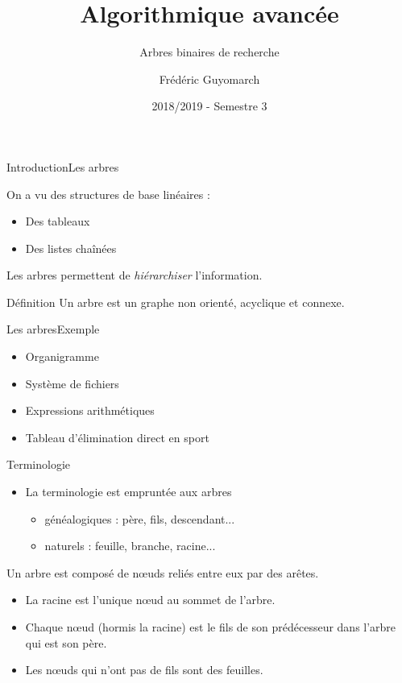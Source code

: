 \documentclass[12pt,a4paper]{beamer}
\title{\textbf{Algorithmique avancée}}
\subtitle{Arbres binaires de recherche}
\author{Frédéric Guyomarch}
\date{2018/2019 - Semestre 3}
\institute %
{

  Université de Lille1\\
  IUT-A de Lille

}
\newcommand{\hl}[1]{\textcolor{blueemph}{#1}}
\begin{document}
\begin{frame}
\titlepage
\end{frame}


\begin{frame}{Introduction}{Les arbres}

On a vu des structures de base linéaires : 
\begin{itemize}
\item Des tableaux
\item Des listes chaînées
\end{itemize}
Les arbres permettent de \emph{hiérarchiser} l'information.
\begin{block}{Définition}
Un arbre est un graphe non orienté, acyclique et connexe.
\end{block}
\end{frame}

\begin{frame}{Les arbres}{Exemple}
\begin{itemize}
\item Organigramme
\item Système de fichiers
\item Expressions arithmétiques
\item Tableau d'élimination direct en sport
\end{itemize}

\end{frame}



\begin{frame}{Terminologie}{}

\begin{itemize}
\item La terminologie est empruntée aux arbres 
\begin{itemize}
\item généalogiques : père, fils, descendant...
\item naturels : feuille, branche, racine...
\end{itemize} 
\end{itemize}
Un arbre est composé de \hl{n\oe uds} reliés entre eux par des \hl{arêtes}.
\begin{itemize}
\item La \hl{racine} est l'unique n\oe ud au sommet de l'arbre. 
\item Chaque n\oe ud (hormis la racine) est le \hl{fils} de son prédécesseur dans l'arbre qui est son \hl{père}. 
\item Les n\oe uds qui n'ont pas de fils sont des \hl{feuilles}.
\end{itemize}
\end{frame}
\end{document}
